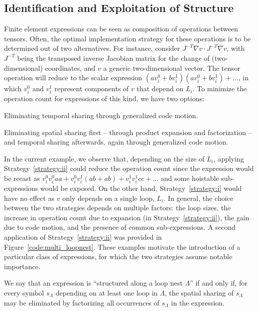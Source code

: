 \subsection{Identification and Exploitation of Structure}
\label{sec:se-rln}
Finite element expressions can be seen as composition of operations between tensors. Often, the optimal implementation strategy for these operations is to be determined out of two alternatives. For instance, consider $J^{-T} \nabla v \cdot J^{-T} \nabla v$, with $J^{-T}$ being the transposed inverse Jacobian matrix for the change of (two-dimensional) coordinates, and $v$ a generic two-dimensional vector. The tensor operation will reduce to the scalar expression $(a v^0_i + b v^1_i) (a v^0_i + b v^1_i) + ...$, in which $v^0_i$ and $v^1_i$ represent components of $v$ that depend on $L_i$. To minimize the operation count for expressions of this kind, we have two options:
\begin{Strategy}
\label{strategy:i}
Eliminating temporal sharing through generalized code motion.
\end{Strategy}
\begin{Strategy}
\label{strategy:ii}
Eliminating spatial sharing first -- through product expansion and factorization -- and temporal sharing afterwards, again through generalized code motion.
\end{Strategy}
In the current example, we observe that, depending on the size of $L_i$, applying Strategy~\ref{strategy:ii} could reduce the operation count since the expression would be recast as $v^0_i v^0_i a a + v^0_i v^1_i (ab + ab) + v^1_i v^1_i c c + ...$ and some hoistable sub-expressions would be exposed. On the other hand, Strategy~\ref{strategy:i} would have no effect as $v$ only depends on a single loop, $L_i$. In general, the choice between the two strategies depends on multiple factors: the loop sizes, the increase in operation count due to expansion (in Strategy~\ref{strategy:ii}), the gain due to code motion, and the presence of common sub-expressions. A second application of Strategy~\ref{strategy:ii} was provided in Figure~\ref{code:multi_loopnest}. These examples motivate the introduction of a particular class of expressions, for which the two strategies assume notable importance.
\begin{Def}
\label{def:struct-expr}
We say that an expression is ``structured along a loop nest $\Lambda$'' if and only if,  for every symbol $s_{\Lambda}$ depending on at least one loop in $\Lambda$, the spatial sharing of $s_{\Lambda}$ may be eliminated by factorizing all occurrences of $s_{\Lambda}$ in the expression.
\end{Def}
